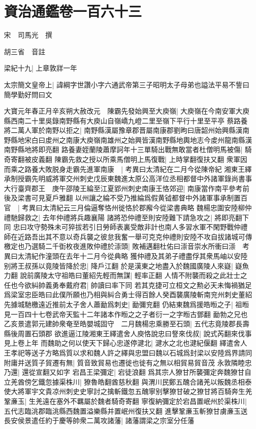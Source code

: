 \chapter{資治通鑑卷一百六十三}
宋　司馬光　撰

胡三省　音註

梁紀十九|{
	上章敦牂一年}


太宗簡文皇帝上|{
	諱綱字世讚小字六通武帝第三子昭明太子母弟也謚法平易不訾曰簡學勤好問曰文}


大寶元年春正月辛亥朔大赦改元　陳霸先發始興至大庾嶺|{
	大庾嶺在今南安軍大庾縣西南二十里吳錄南野縣有大庾山自嶺嶠九嶝二里至嶺下平行十里至平亭}
蔡路養將二萬人軍於南野以拒之|{
	南野縣漢屬豫章郡晋屬南康郡劉昫曰唐韶州始興縣漢南野縣地宋白曰䖍州之南康大庾嶺南雄州之始興皆漢南野縣地輿地志今䖍州龍南縣漢南野縣地將即亮翻}
路養妻姪蘭陵蕭摩訶年十三單騎出戰無敢當者杜僧明馬被傷|{
	騎奇寄翻被皮義翻}
陳霸先救之授以所乘馬僧明上馬復戰|{
	上時掌翻復扶又翻}
衆軍因而乘之路養大敗脱身走霸先進軍南康　|{
	考異曰太清紀在二月今從陳帝紀}
湘東王繹承制授霸先明威將軍交州刺史戊辰東魏進太原公高洋位丞相都督中外諸軍錄尚書事大行臺齊郡王　庚午邵陵王綸至江夏郢州刺史南康王恪郊迎|{
	南康當作南平參考前後及梁書可見夏戶雅翻}
以州讓之綸不受乃推綸爲假黄钺都督中外諸軍事承制置百官　|{
	考異曰太清紀云三月倫逼奪恪州徙恪於郡廨今從梁書典略}
魏楊忠圍安陸柳仲禮馳歸救之|{
	去年仲禮將兵趣襄陽}
諸將恐仲禮至則安陸難下請急攻之|{
	將即亮翻下同}
忠曰攻守勢殊未可猝拔若引日勞師表裏受敵非計也南人多習水軍不閑野戰仲禮師在近路吾出其不意以奇兵襲之彼怠我奮一舉可克克仲禮則安陸不攻自拔諸城可傳檄定也乃選騎二千衘枚夜進敗仲禮於漴頭|{
	敗補邁翻杜佑曰漴音崇水所衝曰漴　考異曰太清紀作潼頭在去年十二月今從典略}
獲仲禮及其弟子禮盡俘其衆馬岫以安陸别將王叔孫以竟陵皆降於忠|{
	降戶江翻}
於是漢東之地盡入於魏國廣陵人來嶷|{
	嶷魚力翻}
說前廣陵太守祖皓曰董紹先輕而無謀|{
	輕率正翻}
人情不附襲而殺之此壯士之任也今欲糾帥義勇奉戴府君|{
	帥讀曰率下同}
若其克捷可立桓文之勲必天未悔禍猶足爲梁室忠臣皓曰此僕所願也乃相與糾合勇士得百餘人癸酉襲廣陵斬南兖州刺史董紹先據城馳檄遠近推前太子舍人蕭勔爲刺史|{
	勔彌兖翻}
仍結東魏爲援皓暅之子|{
	祖暅見一百四十七卷武帝天監十二年諸本作暅之之子者衍一之字暅古鄧翻}
勔勃之兄也乙亥景遣郭元建帥衆奄至皓嬰城固守　二月魏楊忠乘勝至石頭|{
	五代志竟陵郡長壽縣後周置石頭郡}
欲進逼江陵湘東王繹遣舍人庾恪說忠曰詧來伐叔|{
	說式芮翻來伐事見上卷上年}
而魏助之何以使天下歸心忠遂停湕北|{
	湕水之北也湕紀偃翻}
繹遣舍人王孝祀等送子方略爲質以求和魏人許之繹與忠盟曰魏以石城爲封梁以安陸爲界請同附庸并送質子貿遷有無|{
	質音致貿易也遷徙也徙有之無以相貿易貿音茂}
永敦隣睦忠乃還|{
	還從宣翻又如字}
宕昌王梁彌定|{
	宕徒浪翻}
爲其宗人獠甘所襲彌定奔魏獠甘自立羌酋傍乞鐵忽據渠株川|{
	獠魯皓翻酋慈秋翻}
與渭川民鄭五醜合諸羌以叛魏丞相泰使大將軍宇文貴凉州刺史史寧討之擒斬鐵忽五醜寧别擊獠甘破之獠甘將百騎奔生羌鞏亷玉|{
	生羌遠在塞外不羈屬於魏者騎奇寄翻}
寧復納彌定於宕昌置岷州於渠株川|{
	五代志臨洮郡臨洮縣西魏置溢樂縣并置岷州復扶又翻}
進擊鞏亷玉斬獠甘虜亷玉送長安侯景遣任約于慶等帥衆二萬攻諸藩|{
	諸藩謂梁之宗室分任藩}


